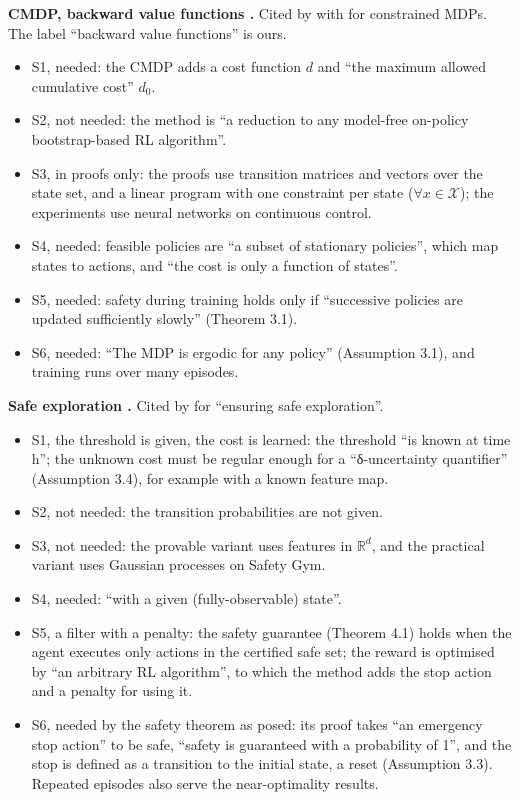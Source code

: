 \documentclass{article}
\providecommand{\tightlist}{\setlength{\itemsep}{0pt}\setlength{\parskip}{0pt}}
\begin{document}
\textbf{CMDP, backward value functions \citep{satija2020}.} Cited by \citet{mclean2026} with \citet{altman1999} for constrained MDPs. The label ``backward value functions'' is ours.

\begin{itemize}
\tightlist
\item
  S1, needed: the CMDP adds a cost function \(d\) and ``the maximum allowed cumulative cost'' \(d_0\).
\item
  S2, not needed: the method is ``a reduction to any model-free on-policy bootstrap-based RL algorithm''.
\item
  S3, in proofs only: the proofs use transition matrices and vectors over the state set, and a linear program with one constraint per state (\(\forall x \in \mathcal{X}\)); the experiments use neural networks on continuous control.
\item
  S4, needed: feasible policies are ``a subset of stationary policies'', which map states to actions, and ``the cost is only a function of states''.
\item
  S5, needed: safety during training holds only if ``successive policies are updated sufficiently slowly'' (Theorem 3.1).
\item
  S6, needed: ``The MDP is ergodic for any policy'' (Assumption 3.1), and training runs over many episodes.
\end{itemize}

\textbf{Safe exploration \citep{wachi2023}.} Cited by \citet{mclean2026} for ``ensuring safe exploration''.

\begin{itemize}
\tightlist
\item
  S1, the threshold is given, the cost is learned: the threshold ``is known at time h''; the unknown cost must be regular enough for a ``δ-uncertainty quantifier'' (Assumption 3.4), for example with a known feature map.
\item
  S2, not needed: the transition probabilities are not given.
\item
  S3, not needed: the provable variant uses features in \(\mathbb{R}^d\), and the practical variant uses Gaussian processes on Safety Gym.
\item
  S4, needed: ``with a given (fully-observable) state''.
\item
  S5, a filter with a penalty: the safety guarantee (Theorem 4.1) holds when the agent executes only actions in the certified safe set; the reward is optimised by ``an arbitrary RL algorithm'', to which the method adds the stop action and a penalty for using it.
\item
  S6, needed by the safety theorem as posed: its proof takes ``an emergency stop action'' to be safe, ``safety is guaranteed with a probability of 1'', and the stop is defined as a transition to the initial state, a reset (Assumption 3.3). Repeated episodes also serve the near-optimality results.
\end{itemize}
\end{document}
